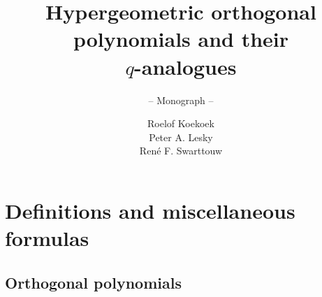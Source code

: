 \documentclass[envcountchap,graybox]{svmono}
\newcounter{rom}
\begin{document}
\author{Roelof Koekoek\\[2.5mm]Peter A. Lesky\\[2.5mm]Ren\'e F. Swarttouw}
\title{Hypergeometric orthogonal polynomials and their\\$q$-analogues}
\subtitle{-- Monograph --}
\maketitle

\frontmatter


\large

\chapter{Definitions and miscellaneous formulas}
\label{Definitions}


\section{Orthogonal polynomials}
\par\setcounter{equation}{0}
\label{orthogonal polynomials}
\end{document}
